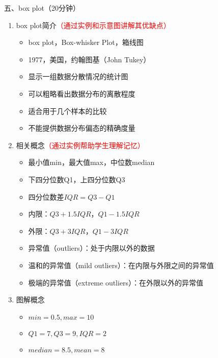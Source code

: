 \documentclass{TIJMUjiaoanLL}
\begin{document}
\vspace*{0.2cm}
\noindent
五、box plot（20分钟）
\begin{enumerate}
  \item box plot简介\textcolor{red}{（通过实例和示意图讲解其优缺点）}
    \begin{itemize}
      \item box plot，Box-whisker Plot，箱线图
      \item 1977，美国，约翰\textbullet 图基（John Tukey）
      \item 显示一组数据分散情况的统计图
      \item 可以粗略看出数据分布的离散程度
      \item 适合用于几个样本的比较
      \item 不能提供数据分布偏态的精确度量
    \end{itemize}
  \item 相关概念\textcolor{red}{（通过实例帮助学生理解记忆）}
  \begin{itemize}
    \item 最小值min，最大值max，中位数median
    \item 下四分位数Q1，上四分位数Q3
    \item 四分位数差$IQR = Q3-Q1$
    \item 内限：$Q3 + 1.5IQR$，$Q1 - 1.5IQR$
    \item 外限：$Q3 + 3IQR$，$Q1 - 3IQR$
    \item 异常值（outliers）：处于内限以外的数据
    \item 温和的异常值（mild outliers）：在内限与外限之间的异常值
    \item 极端的异常值（extreme outliers）：在外限以外的异常值
  \end{itemize}
  \item 图解概念
  \begin{itemize}
    \item $min = 0.5, max = 10$
    \item $Q1 = 7, Q3 = 9, IQR = 2$
    \item $median = 8.5, mean = 8$
  \end{itemize}

\otherTail
\newpage
\otherHeader


\end{enumerate}
\end{document}
